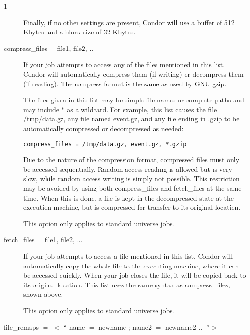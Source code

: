 \begin{ManPage}{\label{man-condor-submit}}{1}
\begin{description}
Finally, if no other settings are present, Condor will use
a buffer of 512 Kbytes
and a block size of 32 Kbytes.


\item[compress\_files = file1, file2, ...]

If your job attempts to access any of the files mentioned in this list,
Condor will automatically compress them (if writing) or decompress them (if reading).
The compress format is the same as used by GNU gzip.

The files given in this list may be simple file names or complete paths and may
include $*$ as a wildcard.  For example, this list causes the file /tmp/data.gz,
any file named event.gz, and any file ending in .gzip to be automatically
compressed or decompressed as needed:

\begin{verbatim}
compress_files = /tmp/data.gz, event.gz, *.gzip
\end{verbatim}
Due to the nature of the compression format, compressed files must only
be accessed sequentially.  Random access reading is allowed but is very slow,
while random access writing is simply not possible.  This restriction may be
avoided by using both compress\_files and fetch\_files at the same time.  When
this is done, a file is kept in the decompressed state at the execution
machine, but is compressed for transfer to its original location.

This option only applies to standard universe jobs.


\item[fetch\_files = file1, file2, ...]

If your job attempts to access a file mentioned in this list,
Condor will automatically copy the whole file to the executing machine,
where it can be accessed quickly.  When your job closes the file,
it will be copied back to its original location.
This list uses the same syntax as compress\_files, shown above.

This option only applies to standard universe jobs.


\item[file\_remaps $=$ $<$ `` name $=$ newname ; name2 $=$ newname2 ... ''$>$ ]


\end{description}
\end{ManPage}
